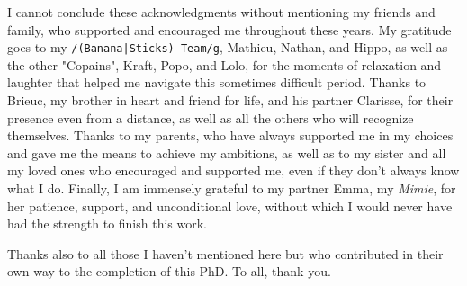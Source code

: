 I cannot conclude these acknowledgments without mentioning my friends and family, who supported and encouraged me throughout these years.
My gratitude goes to my \texttt{/(Banana|Sticks)~Team/g}, Mathieu, Nathan, and Hippo, as well as the other "Copains", Kraft, Popo, and Lolo, for the moments of relaxation and laughter that helped me navigate this sometimes difficult period.
Thanks to Brieuc, my brother in heart and friend for life, and his partner Clarisse, for their presence even from a distance, as well as all the others who will recognize themselves.
Thanks to my parents, who have always supported me in my choices and gave me the means to achieve my ambitions, as well as to my sister and all my loved ones who encouraged and supported me, even if they don't always know what I do.
Finally, I am immensely grateful to my partner Emma, my \emph{Mimie}, for her patience, support, and unconditional love, without which I would never have had the strength to finish this work.

Thanks also to all those I haven't mentioned here but who contributed in their own way to the completion of this PhD.
To all, thank you.